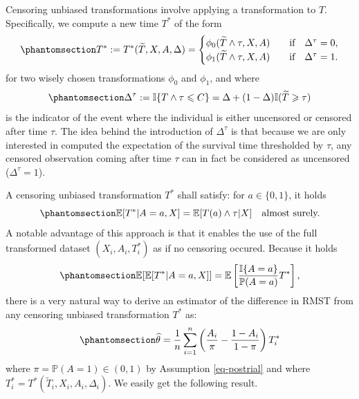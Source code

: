 \documentclass[
  11pt,
  a4paper,
]{article}
\theoremstyle{plain}
\theoremstyle{plain}
\theoremstyle{plain}
\theoremstyle{definition}
\theoremstyle{remark}
\begin{document}
Censoring unbiased transformations involve applying a transformation to
\(T\). Specifically, we compute a new time \(T^*\) of the form
\begin{equation}\phantomsection\label{eq-defcut}{
T^* := T^*(\widetilde T,X,A,\Delta) = \begin{cases}
\phi_0(\widetilde T \wedge \tau,X,A) \quad &\text{if} \quad \Delta^\tau = 0, \\
\phi_1(\widetilde T \wedge \tau,X,A) \quad &\text{if} \quad \Delta^\tau = 1.
\end{cases}
}\end{equation} for two wisely chosen transformations \(\phi_0\) and
\(\phi_1\), and where
\begin{equation}\phantomsection\label{eq-defdeltatau}{\Delta^{\tau}:=\mathbb{I}\{T \wedge \tau \leqslant C\} = \Delta+(1-\Delta)\mathbb{I}(\widetilde T \geqslant\tau)
}\end{equation} is the indicator of the event where the individual is
either uncensored or censored after time \(\tau\). The idea behind the
introduction of \(\Delta^\tau\) is that because we are only interested
in computed the expectation of the survival time thresholded by
\(\tau\), any censored observation coming after time \(\tau\) can in
fact be considered as uncensored (\(\Delta^\tau = 1\)).

A censoring unbiased transformation \(T^*\) shall satisfy: for
\(a \in \{0,1\}\), it holds
\begin{equation}\phantomsection\label{eq-cut}{
\mathbb{E}[T^*|A=a,X] = \mathbb{E}[T(a) \wedge \tau |X] \quad\text{almost surely.}
}\end{equation} A notable advantage of this approach is that it enables
the use of the full transformed dataset \((X_i,A_i,T^*_i)\) as if no
censoring occured. Because it holds
\begin{equation}\phantomsection\label{eq-cutcond}{
\mathbb{E}[\mathbb{E}[T^*|A=a,X]] = \mathbb{E}\left[\frac{\mathbb{I}\{A=a\}}{\mathbb{P}(A=a)} T^*\right],
}\end{equation} there is a very natural way to derive an estimator of
the difference in RMST from any censoring unbiased transformation
\(T^*\) as: \begin{equation}\phantomsection\label{eq-cutest}{
\widehat\theta = \frac1n\sum_{i=1}^n \left(\frac{A_i}{\pi}-\frac{1-A_i}{1-\pi} \right) T^*_i
}\end{equation} where \(\pi = \mathbb{P}(A=1) \in (0,1)\) by Assumption
\ref{eq-postrial} and where
\(T^*_i = T^*(\widetilde T_i,X_i,A_i,\Delta_i)\). We easily get the
following result.
\end{document}
